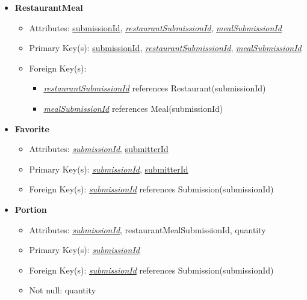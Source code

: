 \begin{itemize}
        \newpage 
        
        \item \textbf{RestaurantMeal}
        \begin{itemize}
            \item Attributes: \underline{submissionId}, \underline{\textit{restaurantSubmissionId}}, \underline{\textit{mealSubmissionId}}
            \item Primary Key(s): \underline{submissionId}, \underline{\textit{restaurantSubmissionId}}, \underline{\textit{mealSubmissionId}}
            \item Foreign Key(s): 
                \begin{itemize}
                    \item \underline{\textit{restaurantSubmissionId}} references Restaurant(submissionId)
                    \item \underline{\textit{mealSubmissionId}} references Meal(submissionId)
                \end{itemize}   
        \end{itemize}

        \item \textbf{Favorite}
        \begin{itemize}
            \item Attributes: \underline{\textit{submissionId}}, \underline{submitterId}
            \item Primary Key(s): \underline{\textit{submissionId}}, \underline{submitterId}
            \item Foreign Key(s): \underline{\textit{submissionId}} references Submission(submissionId)            
        \end{itemize}

        \item \textbf{Portion}
        \begin{itemize}
            \item Attributes: \underline{\textit{submissionId}}, restaurantMealSubmissionId, quantity
            \item Primary Key(s): \underline{\textit{submissionId}}
            \item Foreign Key(s): \underline{\textit{submissionId}} references Submission(submissionId)
            \item Not null: quantity
        \end{itemize}


\end{itemize}
